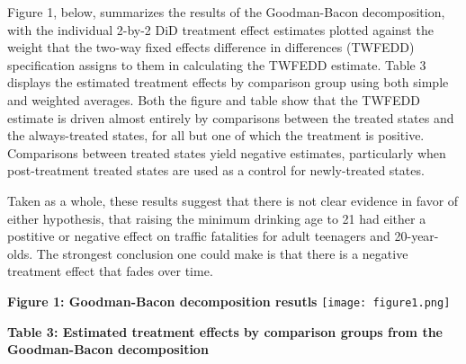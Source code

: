 \documentclass{article}
\begin{document}
Figure 1, below, summarizes the results of the Goodman-Bacon decomposition, with the individual 2-by-2 DiD treatment effect estimates plotted against the weight that the two-way fixed effects difference in differences (TWFEDD) specification assigns to them in calculating the TWFEDD estimate. Table 3 displays the estimated treatment effects by comparison group using both simple and weighted averages. Both the figure and table show that the TWFEDD estimate is driven almost entirely by comparisons between the treated states and the always-treated states, for all but one of which the treatment is positive. Comparisons between treated states yield negative estimates, particularly when post-treatment treated states are used as a control for newly-treated states.

Taken as a whole, these results suggest that there is not clear evidence in favor of either hypothesis, that raising the minimum drinking age to 21 had either a postitive or negative effect on traffic fatalities for adult teenagers and 20-year-olds. The strongest conclusion one could make is that there is a negative treatment effect that fades over time.

\pagebreak
\begin{center}
        \textbf{Figure 1: Goodman-Bacon decomposition resutls}
        \texttt{[image: figure1.png]}
\end{center}

\begin{center}
        \textbf{Table 3: Estimated treatment effects by comparison groups from the Goodman-Bacon decomposition}
        
\end{center}
\end{document}
